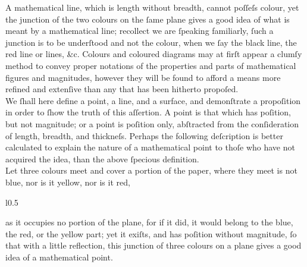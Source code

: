 \begin{minipage}{0.80\textwidth}
    A mathematical line, which is length without breadth, cannot poſſeſs colour, yet the junction of the two colours on the ſame plane gives a good idea of what is meant by a mathematical line; recollect we are ſpeaking familiarly, ſuch a junction is to be underſtood and not the colour, when we ſay the black line, the red line or lines, \&c.  Colours and coloured diagrams may at firſt appear a clumſy method to convey proper notations of the properties and parts of mathematical figures and magnitudes, however they will be found to afford a means more refined and extenſive than any that has been hitherto propoſed.\\

    We ſhall here define a point, a line, and a surface, and demonſtrate a propoſition in order to ſhow the truth of this aſſertion.  A point is that which has poſition, but not magnitude; or a point is poſition only, abſtracted from the conſideration of length, breadth, and thickneſs. Perhaps the following deſcription is better calculated to explain the nature of a mathematical point to thoſe who have not acquired the idea, than the above ſpecious definition.\\

    Let three colours meet and cover a portion of the paper, where they meet is not blue, nor is it yellow, nor is it red,
    \begin{wrapfigure}{l}{0.5\textwidth}
        \centering
        
    \end{wrapfigure}
    as it occupies no portion of the plane, for if it did, it would belong to the blue, the red, or the yellow part; yet it exiſts, and has poſition without magnitude, ſo that with a little reflection, this junction of three colours on a plane gives a good idea of a mathematical point.
\end{minipage}

\newpage

